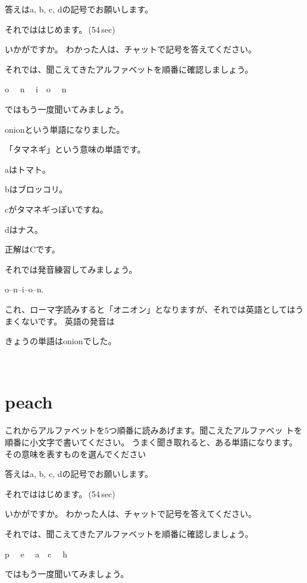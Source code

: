\documentclass[12pt]{jlreq}
\let\textipa\undefined
\begin{document}
答えはa, b, c, dの記号でお願いします。

それでははじめます。\faVolumeUp\,(54\,sec)

いかがですか。
わかった人は、チャットで記号を答えてください。

それでは、聞こえてきたアルファベットを順番に確認しましょう。{\large \ComputerMouse}

o\,\,
{\large \ComputerMouse}\,\,
n\,\,
{\large \ComputerMouse}\,\,
i
{\large \ComputerMouse}\,\,
o\,\,
{\large \ComputerMouse}\,\,
n\,\,

ではもう一度聞いてみましょう。

onionという単語になりました。

「タマネギ」という意味の単語です。

aはトマト。

bはブロッコリ。

cがタマネギっぽいですね。

dはナス。


正解はCです。

それでは発音練習してみましょう。

o--n--i--o--n.

これ、ローマ字読みすると「オニオン」となりますが、それでは英語としてはうまくないです。
英語の発音は\textipa{/2nj@n/}

きょうの単語はonionでした。

{\large \ComputerMouse}\,\,
\newpage
\section{peach}

これからアルファベットを5つ順番に読みあげます。聞こえたアルファベッ
トを順番に小文字で書いてください。
うまく聞き取れると、ある単語になります。
その意味を表すものを選んでください

答えはa, b, c, dの記号でお願いします。

それでははじめます。\faVolumeUp\,(54\,sec)

いかがですか。
わかった人は、チャットで記号を答えてください。

それでは、聞こえてきたアルファベットを順番に確認しましょう。{\large \ComputerMouse}

p\,\,
{\large \ComputerMouse}\,\,
e\,\,
{\large \ComputerMouse}\,\,
a
{\large \ComputerMouse}\,\,
c\,\,
{\large \ComputerMouse}\,\,
h\,\,

ではもう一度聞いてみましょう。
\end{document}
